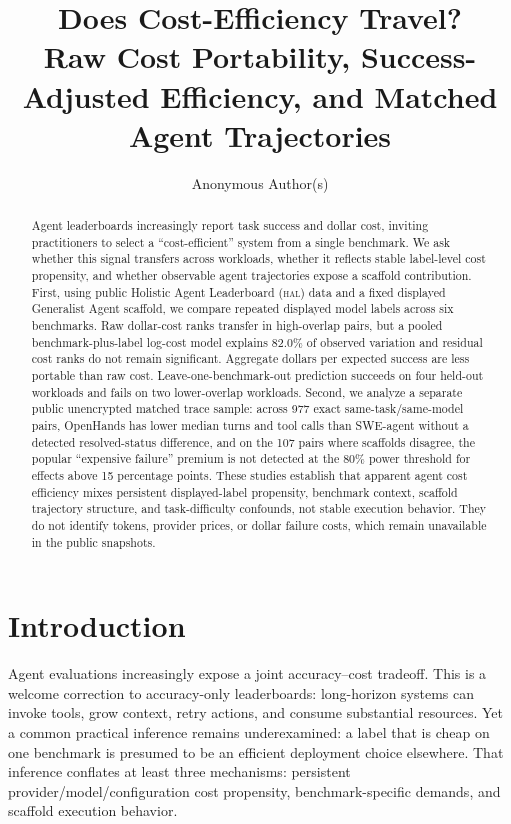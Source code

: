 \documentclass[11pt]{article}
\title{Does Cost-Efficiency Travel?\\
Raw Cost Portability, Success-Adjusted Efficiency, and Matched Agent Trajectories}
\author{Anonymous Author(s)}
\newcommand{\hal}{\textsc{hal}}
\begin{document}
\maketitle

\begin{abstract}
Agent leaderboards increasingly report task success and dollar cost, inviting practitioners to select a ``cost-efficient'' system from a single benchmark. We ask whether this signal transfers across workloads, whether it reflects stable label-level cost propensity, and whether observable agent trajectories expose a scaffold contribution. First, using public Holistic Agent Leaderboard (\hal) data and a fixed displayed Generalist Agent scaffold, we compare repeated displayed model labels across six benchmarks. Raw dollar-cost ranks transfer in high-overlap pairs, but a pooled benchmark-plus-label log-cost model explains 82.0\% of observed variation and residual cost ranks do not remain significant. Aggregate dollars per expected success are less portable than raw cost. Leave-one-benchmark-out prediction succeeds on four held-out workloads and fails on two lower-overlap workloads. Second, we analyze a separate public unencrypted matched trace sample: across 977 exact same-task/same-model pairs, OpenHands has lower median turns and tool calls than SWE-agent without a detected resolved-status difference, and on the 107 pairs where scaffolds disagree, the popular ``expensive failure'' premium is not detected at the 80\% power threshold for effects above 15 percentage points. These studies establish that apparent agent cost efficiency mixes persistent displayed-label propensity, benchmark context, scaffold trajectory structure, and task-difficulty confounds, not stable execution behavior. They do not identify tokens, provider prices, or dollar failure costs, which remain unavailable in the public snapshots.
\end{abstract}

\section{Introduction}

Agent evaluations increasingly expose a joint accuracy--cost tradeoff. This is a welcome correction to accuracy-only leaderboards: long-horizon systems can invoke tools, grow context, retry actions, and consume substantial resources. Yet a common practical inference remains underexamined: a label that is cheap on one benchmark is presumed to be an efficient deployment choice elsewhere. That inference conflates at least three mechanisms: persistent provider/model/configuration cost propensity, benchmark-specific demands, and scaffold execution behavior.
\end{document}
